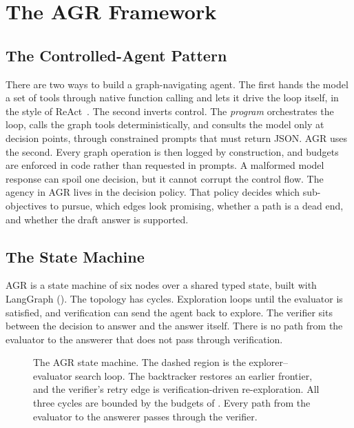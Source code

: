 %
\section{The AGR Framework}\label{sec:framework}

\subsection{The Controlled-Agent Pattern}

There are two ways to build a graph-navigating agent. The first hands the model
a set of tools through native function calling and lets it drive the loop
itself, in the style of ReAct~\cite{yao2023react}. The second inverts control.
The \emph{program} orchestrates the loop, calls the graph tools
deterministically, and consults the model only at decision points, through
constrained prompts that must return JSON. AGR uses the second. Every graph
operation is then logged by construction, and budgets are enforced in code
rather than requested in prompts. A malformed model response can spoil one
decision, but it cannot corrupt the control flow. The agency in AGR lives in the
decision policy. That policy decides which sub-objectives to pursue, which edges
look promising, whether a path is a dead end, and whether the draft answer is
supported.

\subsection{The State Machine}

AGR is a state machine of six nodes over a shared typed state, built with
LangGraph (). The topology has cycles. Exploration loops
until the evaluator is satisfied, and verification can send the agent back to
explore. The verifier sits between the decision to answer and the answer itself.
There is no path from the evaluator to the answerer that does not pass through
verification.

\begin{figure}[!t]
\centering

\caption{The AGR state machine. The dashed region is the explorer--evaluator
  search loop. The backtracker restores an earlier frontier, and the verifier's
  retry edge is verification-driven re-exploration. All three cycles are bounded
  by the budgets of . Every path from the evaluator to the
  answerer passes through the verifier.}
\label{fig:statemachine}
\end{figure}

